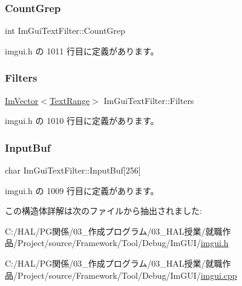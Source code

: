 \subsubsection{\texorpdfstring{Count\+Grep}{CountGrep}}
{\footnotesize\ttfamily int Im\+Gui\+Text\+Filter\+::\+Count\+Grep}



 imgui.\+h の 1011 行目に定義があります。

\mbox{\label{struct_im_gui_text_filter_a5a930a339a9384e6bfadfa56a7c111fd}} 
\subsubsection{\texorpdfstring{Filters}{Filters}}
{\footnotesize\ttfamily \mbox{\hyperlink{class_im_vector}{Im\+Vector}}$<$\mbox{\hyperlink{struct_im_gui_text_filter_1_1_text_range}{Text\+Range}}$>$ Im\+Gui\+Text\+Filter\+::\+Filters}



 imgui.\+h の 1010 行目に定義があります。

\mbox{\label{struct_im_gui_text_filter_ad070acb1038199dd4e8f5d010c5cb5ba}} 
\subsubsection{\texorpdfstring{Input\+Buf}{InputBuf}}
{\footnotesize\ttfamily char Im\+Gui\+Text\+Filter\+::\+Input\+Buf\mbox{[}256\mbox{]}}



 imgui.\+h の 1009 行目に定義があります。



この構造体詳解は次のファイルから抽出されました\+:\begin{DoxyCompactItemize}
\item 
C\+:/\+H\+A\+L/\+P\+G関係/03\+\_\+作成プログラム/03\+\_\+\+H\+A\+L授業/就職作品/\+Project/source/\+Framework/\+Tool/\+Debug/\+Im\+G\+U\+I/\mbox{\hyperlink{imgui_8h}{imgui.\+h}}\item 
C\+:/\+H\+A\+L/\+P\+G関係/03\+\_\+作成プログラム/03\+\_\+\+H\+A\+L授業/就職作品/\+Project/source/\+Framework/\+Tool/\+Debug/\+Im\+G\+U\+I/\mbox{\hyperlink{imgui_8cpp}{imgui.\+cpp}}\end{DoxyCompactItemize}
